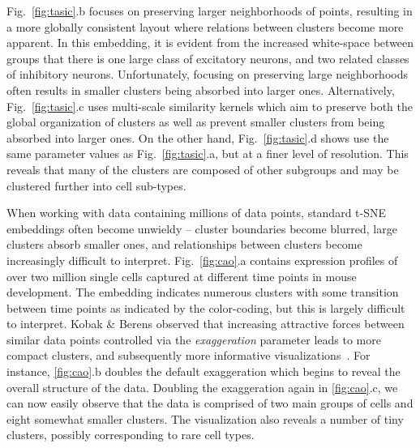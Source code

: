 \documentclass[twocolumn]{bmcart}
\begin{document}
Fig.~\ref{fig:tasic}.b focuses on preserving larger neighborhoods of points,
resulting in a more globally consistent layout where relations between clusters
become more apparent. In this embedding, it is evident from the increased
white-space between groups that there is one large class of excitatory neurons,
and two related classes of inhibitory neurons. Unfortunately, focusing on
preserving large neighborhoods often results in smaller clusters being absorbed
into larger ones. Alternatively, Fig.~\ref{fig:tasic}.c uses multi-scale
similarity kernels which aim to preserve both the global organization of
clusters as well as prevent smaller clusters from being absorbed into larger
ones. On the other hand, Fig.~\ref{fig:tasic}.d shows use the same parameter
values as Fig.~\ref{fig:tasic}.a, but at a finer level of resolution. This
reveals that many of the clusters are composed of other subgroups and may be
clustered further into cell sub-types.

When working with data containing millions of data points, standard t-SNE
embeddings often become unwieldy -- cluster boundaries become blurred, large
clusters absorb smaller ones, and relationships between clusters become
increasingly difficult to interpret. Fig.~\ref{fig:cao}.a contains expression
profiles of over two million single cells captured at different time points in
mouse development. The embedding indicates numerous clusters with some
transition between time points as indicated by the color-coding, but this is
largely difficult to interpret. Kobak \& Berens observed that increasing
attractive forces between similar data points controlled via the
\textit{exaggeration} parameter leads to more compact clusters, and
subsequently more informative visualizations~\cite{kobak2019art}. For instance,
\ref{fig:cao}.b doubles the default exaggeration  which begins to reveal the
overall structure of the data. Doubling the exaggeration again in
\ref{fig:cao}.c, we can now easily observe that the data is comprised of two
main groups of cells and eight somewhat smaller clusters. The visualization
also reveals a number of tiny clusters, possibly corresponding to
rare cell types.
\end{document}
